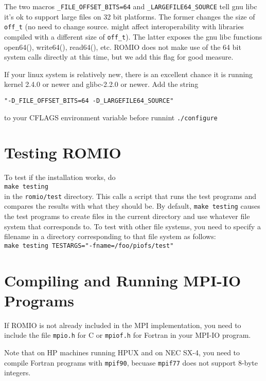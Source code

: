 The two macros {\tt\_FILE\_OFFSET\_BITS=64} and
{\tt\_LARGEFILE64\_SOURCE} tell gnu libc it's ok to support large files
on 32 bit platforms.  The former changes the size of {\tt off\_t} (no
need to change source.  might affect interoperability with libraries
compiled with a different size of {\tt off\_t}).   The latter exposes
the gnu libc functions open64(), write64(), read64(), etc.   ROMIO does
not make use of the 64 bit system calls directly at this time, but we
add this flag for good measure.  

If your linux system is relatively new, there is an excellent chance it
is running kernel 2.4.0 or newer and glibc-2.2.0 or newer.  Add the
string
\begin{verbatim}
"-D_FILE_OFFSET_BITS=64 -D_LARGEFILE64_SOURCE"
\end{verbatim}
to your CFLAGS environment variable before runnint {\tt./configure}

%
%
\section{Testing ROMIO}
To test if the installation works, do\\
\hspace*{.4in} {\tt make testing}\\
in the {\tt romio/test} directory. This calls a script that runs the test
programs and compares the results with what they should be. By
default, {\tt make testing} causes the test programs to create files in
the current directory and use whatever file system that corresponds
to. To test with other file systems, you need to specify a filename in
a directory corresponding to that file system as follows:\\
\hspace*{.4in} {\tt make testing TESTARGS="-fname=/foo/piofs/test"}


%
%
\section{Compiling and Running MPI-IO Programs}
If ROMIO is not already included in the MPI implementation, you need
to include the file {\tt mpio.h} for C or {\tt mpiof.h} for Fortran in
your MPI-IO program.  

Note that on HP machines running HPUX and on NEC SX-4, you need to
compile Fortran programs with {\tt mpif90}, becuase {\tt mpif77} does
not support 8-byte integers. 

